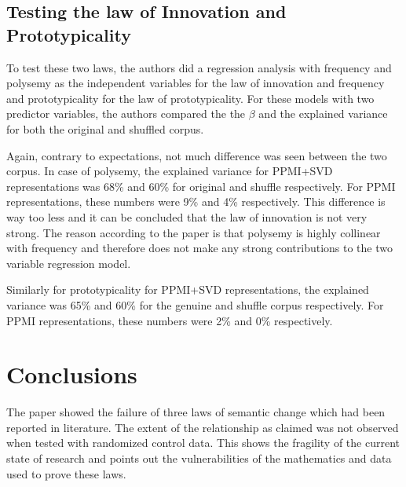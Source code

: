 \documentclass[a0,landscape]{a0poster}
\begin{document}
\begin{multicols}{4}
\subsection*{Testing the law of Innovation and Prototypicality}
To test these two laws, the authors did a regression analysis with frequency and polysemy as the independent variables for the law of innovation and frequency and prototypicality for the law of prototypicality. For these models with two predictor variables, the authors compared the the $\beta$ and the explained variance for both the original and shuffled corpus.

Again, contrary to expectations, not much difference was seen between the two corpus. In case of polysemy, the explained variance for PPMI+SVD representations was 68\% and 60\% for original and shuffle respectively. For PPMI representations, these numbers were 9\% and 4\% respectively. This difference is way too less and it can be concluded that the law of innovation is not very strong. The reason according to the paper is that polysemy is highly collinear with frequency and therefore does not make any strong contributions to the two variable regression model.

Similarly for prototypicality for PPMI+SVD representations, the explained variance was 65\% and 60\% for the genuine and shuffle corpus respectively. For PPMI representations, these numbers were 2\% and 0\% respectively.




\color{SaddleBrown} %

\section*{Conclusions}
The paper showed the failure of three laws of semantic change which had been reported in literature. The extent of the relationship as claimed was not observed when tested with randomized control data. This shows the fragility of the current state of research and points out the vulnerabilities of the mathematics and data used to prove these laws.


\end{multicols}
\end{document}
